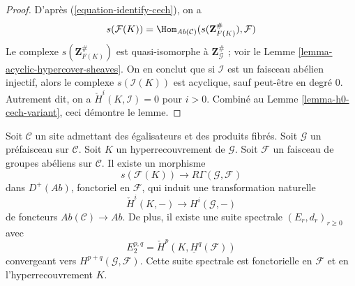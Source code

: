 \begin{proof}
D'après (\ref{equation-identify-cech}), on a
$$
s(\mathcal{F}(K))
=
\Hom_{\textit{Ab}(\mathcal{C})}(s(\mathbf{Z}_{F(K)}^\#), \mathcal{F})
$$
Le complexe $s(\mathbf{Z}_{F(K)}^\#)$ est quasi-isomorphe
à $\mathbf{Z}_\mathcal{G}^\#$ ; voir le
Lemme \ref{lemma-acyclic-hypercover-sheaves}. On en conclut
que si $\mathcal{I}$ est un faisceau abélien injectif, alors
le complexe $s(\mathcal{I}(K))$ est acyclique, sauf peut-être en degré $0$.
Autrement dit, on a $\check{H}^i(K, \mathcal{I}) = 0$
pour $i > 0$. Combiné au Lemme \ref{lemma-h0-cech-variant},
ceci démontre le lemme.
\end{proof}

\begin{lemma}
\label{lemma-cech-spectral-sequence-variant}
Soit $\mathcal{C}$ un site admettant des égalisateurs et des produits fibrés.
Soit $\mathcal{G}$ un préfaisceau sur $\mathcal{C}$.
Soit $K$ un hyperrecouvrement de $\mathcal{G}$.
Soit $\mathcal{F}$ un faisceau de groupes abéliens sur $\mathcal{C}$.
Il existe un morphisme
$$
s(\mathcal{F}(K)) \longrightarrow R\Gamma(\mathcal{G}, \mathcal{F})
$$
dans $D^{+}(\textit{Ab})$, fonctoriel en $\mathcal{F}$, qui induit
une transformation naturelle
$$
\check{H}^i(K, -) \longrightarrow H^i(\mathcal{G}, -)
$$
de foncteurs $\textit{Ab}(\mathcal{C}) \to \textit{Ab}$. De plus,
il existe une suite spectrale $(E_r, d_r)_{r \geq 0}$ avec
$$
E_2^{p, q} = \check{H}^p(K, \underline{H}^q(\mathcal{F}))
$$
convergeant vers $H^{p + q}(\mathcal{G}, \mathcal{F})$.
Cette suite spectrale est fonctorielle en $\mathcal{F}$ et
en l'hyperrecouvrement $K$.
\end{lemma}

